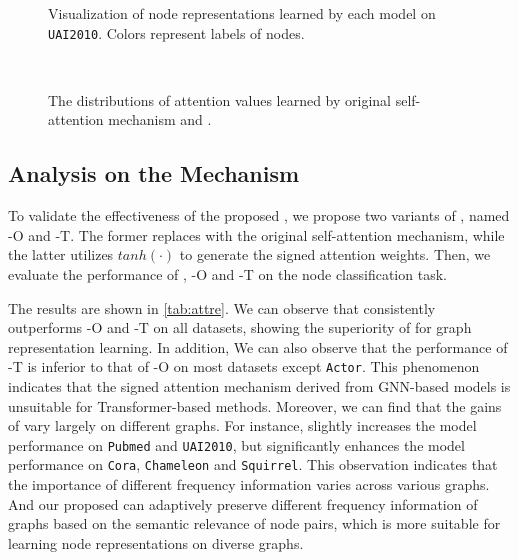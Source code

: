 \documentclass[sigconf, screen]{acmart}
\begin{document}
\begin{figure*} [ht]
	\centering
	\caption{Visualization of node representations learned by each model on \texttt{UAI2010}. Colors represent labels of nodes.}
	\label{fig:vision}
\end{figure*}







%
 \begin{figure} [ht]
	\centering
  \\

	\caption{The distributions of attention values learned by original self-attention mechanism and \saname.}
	\label{fig:viattention}
\end{figure}



%
 
\subsection{Analysis on the \saname Mechanism}
To validate the effectiveness of the proposed \saname, we propose two variants of \name, named \name-O and \name-T.
The former replaces \saname with the original self-attention mechanism, while the latter utilizes $\mathit{tanh}(\cdot)$ to generate the signed attention weights.
Then, we evaluate the performance of \name, \name-O and \name-T on the node classification task. 

The results are shown in \autoref{tab:attre}.
We can observe that \name consistently outperforms \name-O and \name-T on all datasets, showing the superiority of \saname for graph representation learning.    
In addition, We can also observe that the performance of \name-T is inferior to that of \name-O on most datasets except \texttt{Actor}.
This phenomenon indicates that the signed attention mechanism derived from GNN-based models is unsuitable for Transformer-based methods. 
Moreover, we can find that the gains of \saname vary largely on different graphs.
For instance, \saname slightly increases the model performance on \texttt{Pubmed} and \texttt{UAI2010}, but significantly enhances the model performance on \texttt{Cora}, \texttt{Chameleon} and \texttt{Squirrel}. 
This observation indicates that the importance of different frequency information varies across various graphs.
And our proposed \saname can adaptively preserve different frequency information of graphs based on the semantic relevance of node pairs, which is more suitable for learning node representations on diverse graphs.
\end{document}
